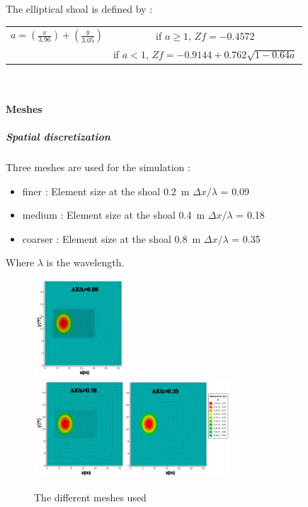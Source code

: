 \vspace{1cm}

The elliptical shoal is defined by :\\
\begin{center}

\begin{tabular}{c|c}
$a = (\frac{x}{3.96})+(\frac{y}{3.05})$ & if $a \geq 1$, $Zf = -0.4572$\\
 & if $a < 1$, $Zf = -0.9144+0.762 \sqrt{1-0.64a}$
\end{tabular}\\
\end{center}
\paragraph{Meshes}
\subparagraph{Spatial discretization}
Three meshes are used for the simulation :
\begin{itemize}
\item finer : Element size at the shoal 0.2~m \quad $\Delta x/\lambda$ = 0.09
\item medium : Element size at the shoal 0.4~m \quad $\Delta x/\lambda$ = 0.18
\item coarser : Element size at the shoal 0.8~m \quad $\Delta x/\lambda$ = 0.35
\end{itemize}

Where $\lambda$ is the wavelength.
\begin{figure}[h!]
  \centering
    \includegraphics[width=0.3\textwidth]{mesh009.jpg}\\
    \includegraphics[width=0.65\textwidth]{meshes018035.jpg}
      \caption{The different meshes used}
\label{meshshoal}
\end{figure}


